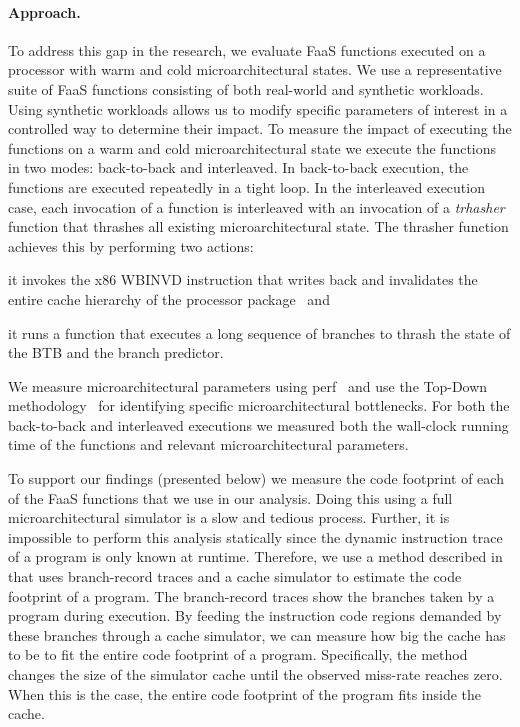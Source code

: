 \documentclass[../main.tex]{subfiles}
\begin{document}
\begin{refsection}
\paragraph{Approach.}
To address this gap in the research, we evaluate FaaS functions
executed on a processor with warm and cold microarchitectural
states. We use a representative suite of FaaS functions consisting of
both real-world and synthetic workloads. Using synthetic workloads
allows us to modify specific parameters of interest in a controlled
way to determine their impact. To measure the impact of executing the
functions on a warm and cold microarchitectural state we execute the
functions in two modes: back-to-back and interleaved. In back-to-back
execution, the functions are executed repeatedly in a tight loop. In
the interleaved execution case, each invocation of a function is
interleaved with an invocation of a \emph{trhasher} function that
thrashes all existing microarchitectural state. The thrasher function
achieves this by performing two actions: \begin{inparaenum}[1)]
\item it invokes the x86 WBINVD
  instruction that writes back and invalidates the entire cache
  hierarchy of the processor package~\cite[Chapter 6]{intelmanual} and \item it runs a function that
  executes a long sequence of branches to thrash the state of
  the BTB and the branch predictor. \end{inparaenum} We measure
microarchitectural parameters using perf~\cite{perftool} and use the Top-Down
methodology~\cite{yasin14_top_down} for identifying specific
microarchitectural bottlenecks. For both the back-to-back and
interleaved executions we measured both the wall-clock running time of
the functions and relevant microarchitectural parameters.


To support our findings (presented below) we measure the code
footprint of each of the FaaS functions that we use in our
analysis. Doing this using a full microarchitectural simulator is a
slow and tedious process. Further, it is impossible to perform this
analysis statically since the dynamic instruction trace of a program
is only known at runtime. Therefore, we use a method described
in~\cite{splash2} that uses branch-record traces and a cache simulator
to estimate the code footprint of a program. The branch-record traces
show the branches taken by a program during execution. By feeding the
instruction code regions demanded by these branches through a cache
simulator, we can measure how big the cache has to be to fit the
entire code footprint of a program.  Specifically, the method changes
the size of the simulator cache until the observed miss-rate reaches
zero. When this is the case, the entire code footprint of the program
fits inside the cache.



\end{refsection}
\end{document}
